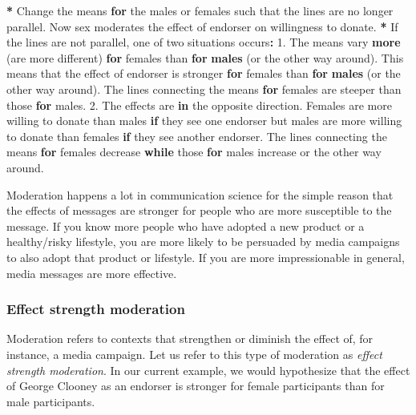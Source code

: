 \documentclass[a4paper]{book}
\newenvironment{Shaded}{\begin{snugshade}}{\end{snugshade}}
\newcommand{\KeywordTok}[1]{\textcolor[rgb]{0,0,0}{\textbf{#1}}}
\newcommand{\DecValTok}[1]{\textcolor[rgb]{0.00,0.00,0.00}{#1}}
\newcommand{\StringTok}[1]{\textcolor[rgb]{0.00,0.00,0.00}{#1}}
\newcommand{\ControlFlowTok}[1]{\textcolor[rgb]{0.00,0.00,0.00}{\textbf{#1}}}
\newcommand{\OperatorTok}[1]{\textcolor[rgb]{0.00,0.00,0.00}{\textbf{#1}}}
\newcommand{\NormalTok}[1]{#1}
\theoremstyle{definition}
\theoremstyle{definition}
\theoremstyle{definition}
\theoremstyle{remark}
\begin{document}
\begin{Shaded}
\begin{Highlighting}[]
\OperatorTok{*}\StringTok{ }\NormalTok{Change the means }\ControlFlowTok{for}\NormalTok{ the males or females such that the lines are no longer}
\NormalTok{parallel. Now sex moderates the effect of endorser on willingness to donate.}
\OperatorTok{*}\StringTok{ }\NormalTok{If the lines are not parallel, one of two situations occurs}\OperatorTok{:}
\StringTok{ }\DecValTok{1}\NormalTok{. The means vary }\KeywordTok{more}\NormalTok{ (are more different) }\ControlFlowTok{for}\NormalTok{ females than }\ControlFlowTok{for} \KeywordTok{males}\NormalTok{ (or}
\NormalTok{ the other way around). This means that the effect of endorser is stronger }\ControlFlowTok{for}
\NormalTok{ females than }\ControlFlowTok{for} \KeywordTok{males}\NormalTok{ (or the other way around). The lines connecting the }
\NormalTok{ means }\ControlFlowTok{for}\NormalTok{ females are steeper than those }\ControlFlowTok{for}\NormalTok{ males.}
 \DecValTok{2}\NormalTok{. The effects are }\ControlFlowTok{in}\NormalTok{ the opposite direction. Females are more willing to}
\NormalTok{ donate than males }\ControlFlowTok{if}\NormalTok{ they see one endorser but males are more willing to}
\NormalTok{ donate than females }\ControlFlowTok{if}\NormalTok{ they see another endorser. The lines connecting the }
\NormalTok{ means }\ControlFlowTok{for}\NormalTok{ females decrease }\ControlFlowTok{while}\NormalTok{ those }\ControlFlowTok{for}\NormalTok{ males increase or the other way}
\NormalTok{ around.}
\end{Highlighting}
\end{Shaded}

Moderation happens a lot in communication science for the simple reason
that the effects of messages are stronger for people who are more
susceptible to the message. If you know more people who have adopted a
new product or a healthy/risky lifestyle, you are more likely to be
persuaded by media campaigns to also adopt that product or lifestyle. If
you are more impressionable in general, media messages are more
effective.

\subsubsection{Effect strength
moderation}\label{effect-strength-moderation}

Moderation refers to contexts that strengthen or diminish the effect of,
for instance, a media campaign. Let us refer to this type of moderation
as \emph{effect strength moderation}. In our current example, we would
hypothesize that the effect of George Clooney as an endorser is stronger
for female participants than for male participants.
\end{document}
